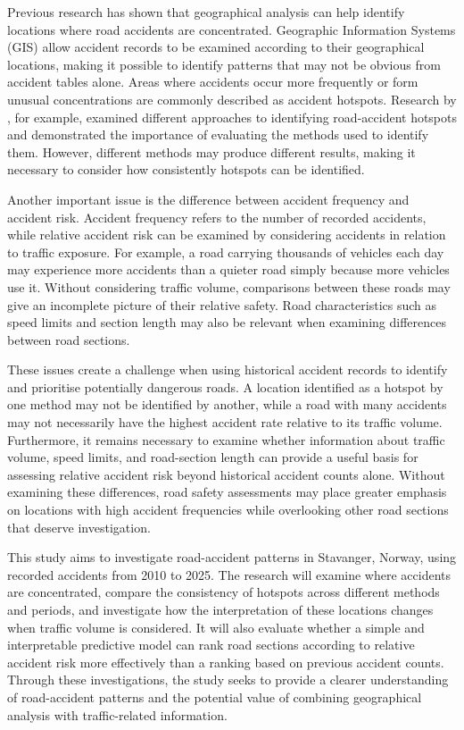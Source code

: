 Previous research has shown that geographical analysis can help identify locations where road accidents are concentrated. Geographic Information Systems (GIS) allow accident records to be examined according to their geographical locations, making it possible to identify patterns that may not be obvious from accident tables alone. Areas where accidents occur more frequently or form unusual concentrations are commonly described as accident hotspots. Research by \textcite{Zahran2021}, for example, examined different approaches to identifying road-accident hotspots and demonstrated the importance of evaluating the methods used to identify them. However, different methods may produce different results, making it necessary to consider how consistently hotspots can be identified.

Another important issue is the difference between accident frequency and accident risk. Accident frequency refers to the number of recorded accidents, while relative accident risk can be examined by considering accidents in relation to traffic exposure. For example, a road carrying thousands of vehicles each day may experience more accidents than a quieter road simply because more vehicles use it. Without considering traffic volume, comparisons between these roads may give an incomplete picture of their relative safety. Road characteristics such as speed limits and section length may also be relevant when examining differences between road sections.

These issues create a challenge when using historical accident records to identify and prioritise potentially dangerous roads. A location identified as a hotspot by one method may not be identified by another, while a road with many accidents may not necessarily have the highest accident rate relative to its traffic volume. Furthermore, it remains necessary to examine whether information about traffic volume, speed limits, and road-section length can provide a useful basis for assessing relative accident risk beyond historical accident counts alone. Without examining these differences, road safety assessments may place greater emphasis on locations with high accident frequencies while overlooking other road sections that deserve investigation.

This study aims to investigate road-accident patterns in Stavanger, Norway, using recorded accidents from 2010 to 2025. The research will examine where accidents are concentrated, compare the consistency of hotspots across different methods and periods, and investigate how the interpretation of these locations changes when traffic volume is considered. It will also evaluate whether a simple and interpretable predictive model can rank road sections according to relative accident risk more effectively than a ranking based on previous accident counts. Through these investigations, the study seeks to provide a clearer understanding of road-accident patterns and the potential value of combining geographical analysis with traffic-related information.

